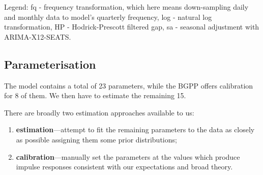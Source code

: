\documentclass[12pt]{article}
\begin{document}
\begin{table}[H]
\centering
{}
\end{table}

Legend: fq - frequency transformation, which here means down-sampling daily and monthly data to model's quarterly frequency, log - natural log transformation, HP - Hodrick-Prescott filtered gap, sa - seasonal adjustment with ARIMA-X12-SEATS. 

\subsection{Parameterisation}
\label{ssec:estqpm}

The model contains a total of 23 parameters, while the BGPP offers calibration for 8 of them. We then have to estimate the remaining 15. 

There are broadly two estimation approaches available to us:
\begin{enumerate}
    \item {\bf estimation}---attempt to fit the remaining parameters to the data as closely as possible assigning them some prior distributions;
    \item {\bf calibration}---manually set the parameters at the values which produce impulse responses consistent with our expectations and broad theory. 
\end{enumerate}
\end{document}
